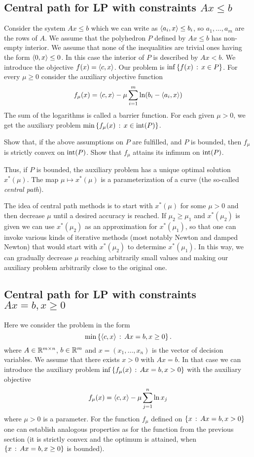 \subsection{Central path for LP with constraints \texorpdfstring{$Ax \le b$}{Ax <= b}}

Consider the system $A x \le b$ which we can write as $\left\langle a_i , x \right\rangle \le b_i$, so $a_1,\ldots,a_m$ are the rows of $A$. We assume that the polyhedron $P$ defined by $A x \le b$ has non-empty interior. We assume that none of the inequalities are trivial ones having the form $\left\langle 0 , x \right\rangle \le 0$. In this case the interior of $P$ is described by $A x < b$. We introduce the objective $f(x) = \left\langle c , x \right\rangle$. Our problem is $\inf \left\{ f(x) \,:\, x \in P \right\}$. For every $\mu \ge 0$ consider the auxiliary objective function 
\[
	f_\mu(x) = \left\langle c , x \right\rangle - \mu \sum_{i=1}^m \ln(b_i- \left\langle a_i , x \right\rangle)
\]
The sum of the logarithms is called a barrier function. For each given $\mu> 0$, we get the auxiliary problem $\min \left\{ f_\mu(x) \,:\, x \in \operatorname{int}(P) \right\}$. 

\begin{exercise}
	Show that, if the above assumptions on $P$ are fulfilled, and $P$ is bounded, then $f_\mu$ is strictly convex on $\operatorname{int}(P)$. Show that $f_\mu$ attains its infimum on $\operatorname{int}(P)$. 
\end{exercise}

Thus, if $P$ is bounded, the auxiliary problem has a unique optimal solution $x^\ast(\mu)$. The map $\mu \mapsto x^\ast(\mu)$ is a parameterization of a curve (the so-called \emph{central path}). 

The idea of central path methods is to start with $x^\ast(\mu)$ for some $\mu>0$ and then decrease $\mu$ until a desired accuracy is reached. If $\mu_2 \ge \mu_1$ and $x^\ast(\mu_2)$ is given we can use $x^\ast(\mu_2)$ as an approximation for $x^\ast(\mu_1)$, so that one can invoke various kinds of iterative methods (most notably Newton and damped Newton) that would start with $x^\ast(\mu_2)$ to determine $x^\ast(\mu_1)$. In this way, we can gradually decrease $\mu$ reaching arbitrarily small values and making our auxiliary problem arbitrarily close to the original one.

\subsection{Central path for LP with constraints \texorpdfstring{$Ax=b, x \ge 0$}{Ax = b, x >= 0}}

Here we consider the problem in the form 
\[
	\min \left\{ \left\langle c , x \right\rangle \,:\, A x = b, x \ge 0 \right\}.
\]
where $A \in \mathbb{R}^{m \times n}$, $b \in \mathbb{R}^m$ and $x=(x_1,\ldots,x_n)$ is the vector of decision variables.
We assume that there exists $x > 0$ with $A x =b$. In that case we can introduce the auxiliary  problem $\inf \left\{ f_\mu(x) \,:\, A x= b, x > 0 \right\}$ with the auxiliary objective 
\[
	f_\mu(x) = \left\langle c , x \right\rangle - \mu \sum_{j=1}^n \ln x_j
\]
where $\mu>0$ is a parameter. For the function $f_\mu$ defined on $\left\{ x \,:\, A x =b, x >0 \right\}$ one can establish analogous properties as for the function from the previous section (it is strictly convex and the optimum is attained, when $\left\{ x \,:\, A x=b,x \ge 0 \right\}$ is bounded). 

